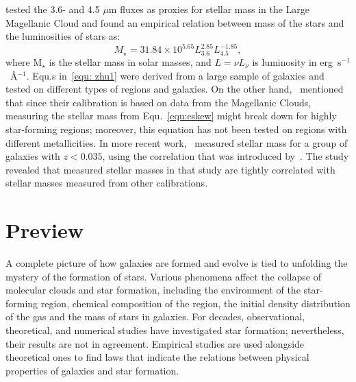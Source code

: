 \cite{Eskew12} tested the 3.6- and 4.5 $\mu$m fluxes as proxies for stellar mass in the Large Magellanic Cloud and found an empirical relation between mass of the stars and the luminosities of stars as:
\begin{equation}
\label{equ:eskew}
  M_{\star} = 31.84 \times 10^{5.65} L_{3.6}^{2.85} L_{4.5}^{-1.85},
\end{equation}
where M$_{\star}$ is the stellar mass in solar masses, and $L = \nu L_{\nu}$ is luminosity in erg~s$^{-1}$~\AA$^{-1}$.
Equ.s in~\ref{equ: zhu1} were derived from a large sample of galaxies and tested on different types of regions and galaxies.
On the other hand,~\cite{Eskew12} mentioned that since their calibration is based on data from the Magellanic Clouds,
measuring the stellar mass from Equ.~\ref{equ:eskew} might break down for highly star-forming regions; moreover, this equation has not been tested on regions with different metallicities. 
In more recent work,~\cite{Laura16} measured stellar mass for a group of galaxies with $z < 0.035$, using the correlation that was introduced by~\cite{Eskew12}. 
The study revealed that measured stellar masses in that study are tightly correlated with stellar masses measured from other calibrations.

\section{Preview}
\label{sec: pre_intro}

A complete picture of how galaxies are formed and evolve is tied to unfolding the mystery of the formation of stars.
Various phenomena affect the collapse of molecular clouds and star formation, including the environment of the star-forming region, chemical composition of the region, the initial density distribution of the gas and the mass of stars in galaxies.
For decades, observational, theoretical, and numerical studies have investigated star formation; nevertheless, their results are not in agreement.
Empirical studies are used alongside theoretical ones to find laws that indicate the relations between physical properties of galaxies and star formation.

